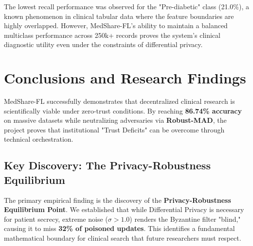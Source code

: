 \documentclass[10pt, a4paper, twocolumn]{article}
\begin{document}
The lowest recall performance was observed for the "Pre-diabetic" class (21.0\%), a known phenomenon in clinical tabular data where the feature boundaries are highly overlapped. However, MedShare-FL's ability to maintain a balanced multiclass performance across 250k+ records proves the system's clinical diagnostic utility even under the constraints of differential privacy.

\begin{table}[hbt!]
\centering
\scriptsize
{}
\caption{Security Benchmarking: MedShare-FL vs. Industry Standard Baselines. Under a high-magnitude "Gradient Scaling" attack in the Thyroid domain, the standard Flower/Opacus pipeline collapses (producing NaN loss and 0\% utility). In contrast, the MedShare-FL Robust-MAD filter isolates the anomaly, successfully maintaining 79.20\% clinical diagnostic accuracy.}
\end{table}

\section{Conclusions and Research Findings}
MedShare-FL successfully demonstrates that decentralized clinical research is scientifically viable under zero-trust conditions. By reaching \textbf{86.74\% accuracy} on massive datasets while neutralizing adversaries via \textbf{Robust-MAD}, the project proves that institutional "Trust Deficits" can be overcome through technical orchestration.

\subsection{Key Discovery: The Privacy-Robustness Equilibrium}
The primary empirical finding is the discovery of the \textbf{Privacy-Robustness Equilibrium Point}. We established that while Differential Privacy is necessary for patient secrecy, extreme noise ($\sigma > 1.0$) renders the Byzantine filter "blind," causing it to miss \textbf{32\% of poisoned updates}. This identifies a fundamental mathematical boundary for clinical search that future researchers must respect.
\end{document}
